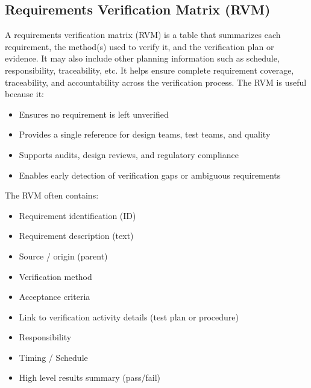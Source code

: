 \documentclass[12pt]{article}
\begin{document}
\subsection{Requirements Verification Matrix (RVM)}
A requirements verification matrix (RVM) is a table that summarizes each requirement, the method(s) used to verify it, and the verification plan or evidence.
It may also include other planning information such as schedule, responsibility, traceability, etc.
It helps ensure complete requirement coverage, traceability, and accountability across the verification process. 
The RVM is useful because it: 
\begin{itemize}
\item Ensures no requirement is left unverified
\item Provides a single reference for design teams, test teams, and quality
\item Supports audits, design reviews, and regulatory compliance
\item Enables early detection of verification gaps or ambiguous requirements
\end{itemize}
The RVM often contains: 
\begin{itemize}
\item Requirement identification (ID)
\item Requirement description (text)
\item Source / origin (parent)
\item Verification method
\item Acceptance criteria
\item Link to verification activity details (test plan or procedure)
\item Responsibility
\item Timing / Schedule
\item High level results summary (pass/fail)
\end{itemize}
\end{document}
